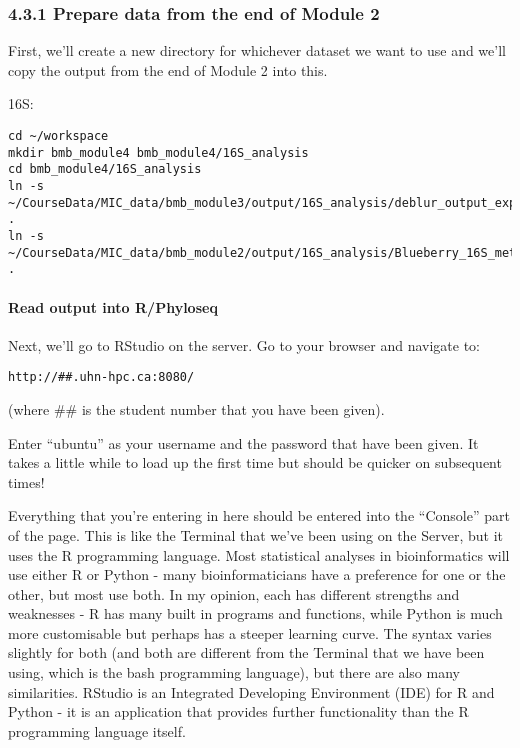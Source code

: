 \documentclass[
]{book}
\begin{document}
\subsubsection{4.3.1 Prepare data from the end of Module 2}\label{prepare-data-from-the-end-of-module-2-1}

First, we'll create a new directory for whichever dataset we want to use and we'll copy the output from the end of Module 2 into this.

16S:

\begin{verbatim}
cd ~/workspace
mkdir bmb_module4 bmb_module4/16S_analysis
cd bmb_module4/16S_analysis
ln -s ~/CourseData/MIC_data/bmb_module3/output/16S_analysis/deblur_output_exported/ .
ln -s ~/CourseData/MIC_data/bmb_module2/output/16S_analysis/Blueberry_16S_metadata.tsv .
\end{verbatim}

\paragraph{Read output into R/Phyloseq}\label{read-output-into-rphyloseq-1}

Next, we'll go to RStudio on the server. Go to your browser and navigate to:

\begin{verbatim}
http://##.uhn-hpc.ca:8080/
\end{verbatim}

(where \#\# is the student number that you have been given).

Enter ``ubuntu'' as your username and the password that have been given. It takes a little while to load up the first time but should be quicker on subsequent times!

Everything that you're entering in here should be entered into the ``Console'' part of the page. This is like the Terminal that we've been using on the Server, but it uses the R programming language. Most statistical analyses in bioinformatics will use either R or Python - many bioinformaticians have a preference for one or the other, but most use both. In my opinion, each has different strengths and weaknesses - R has many built in programs and functions, while Python is much more customisable but perhaps has a steeper learning curve. The syntax varies slightly for both (and both are different from the Terminal that we have been using, which is the bash programming language), but there are also many similarities. RStudio is an Integrated Developing Environment (IDE) for R and Python - it is an application that provides further functionality than the R programming language itself.
\end{document}
